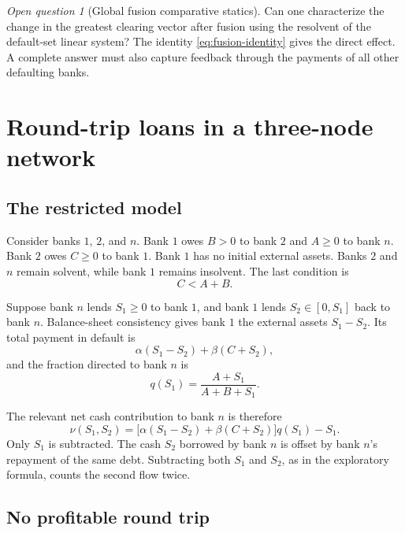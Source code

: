 \documentclass[11pt]{article}
\theoremstyle{definition}
\theoremstyle{remark}
\newtheorem{question}[theorem]{Open question}
\begin{document}
\begin{question}[Global fusion comparative statics]
Can one characterize the change in the greatest clearing vector after fusion
using the resolvent of the default-set linear system?  The identity
\eqref{eq:fusion-identity} gives the direct effect.  A complete answer must also
capture feedback through the payments of all other defaulting banks.
\end{question}

\section{Round-trip loans in a three-node network}

\subsection{The restricted model}

Consider banks $1$, $2$, and $n$.  Bank $1$ owes $B>0$ to bank $2$ and $A\geq0$
to bank $n$.  Bank $2$ owes $C\geq0$ to bank $1$.  Bank $1$ has no initial
external assets.  Banks $2$ and $n$ remain solvent, while bank $1$ remains
insolvent.  The last condition is
\begin{equation}\label{eq:base-insolvency}
  C<A+B.
\end{equation}

Suppose bank $n$ lends $S_1\geq0$ to bank $1$, and bank $1$ lends
$S_2\in[0,S_1]$ back to bank $n$.  Balance-sheet consistency gives bank $1$
the external assets $S_1-S_2$.  Its total payment in default is
\begin{equation}
  \alpha(S_1-S_2)+\beta(C+S_2),
\end{equation}
and the fraction directed to bank $n$ is
\begin{equation}
  q(S_1)=\frac{A+S_1}{A+B+S_1}.
\end{equation}

The relevant net cash contribution to bank $n$ is therefore
\begin{equation}\label{eq:corrected-loan-payoff}
  \nu(S_1,S_2)
  =\bigl[\alpha(S_1-S_2)+\beta(C+S_2)\bigr]q(S_1)-S_1.
\end{equation}
Only $S_1$ is subtracted.  The cash $S_2$ borrowed by bank $n$ is offset by
bank $n$'s repayment of the same debt.  Subtracting both $S_1$ and $S_2$, as in
the exploratory formula, counts the second flow twice.

\subsection{No profitable round trip}
\end{document}
